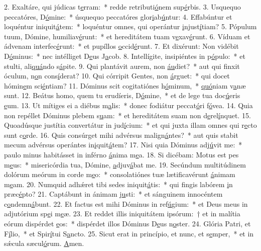 2. Exaltáre, qui júdicas t\uline{e}rram:~* redde retributi\uline{ó}nem sup\uline{é}rbis.
3. Usquequo peccatóres, D\uline{ó}mine:~* úsquequo peccatóres glor\uline{i}ab\uline{ú}ntur:
4. Effabúntur et loquéntur iniquit\uline{á}tem:~* loquéntur omnes, qui operántur \uline{i}njust\uline{í}tiam?
5. Pópulum tuum, Dómine, humiliav\uline{é}runt:~* et hereditátem tuam v\uline{e}xav\uline{é}runt.
6. Víduam et ádvenam interfec\uline{é}runt:~* et pupíllos \uline{o}ccid\uline{é}runt.
7. Et dixérunt: Non vidébit D\uline{ó}minus:~* nec intélliget D\uline{e}us J\uline{a}cob.
8. Intellígite, insipiéntes in p\uline{ó}pulo:~* et stulti, ali\uline{quá}ndo s\uline{á}pite.
9. Qui plantávit aurem, non \uline{áu}diet?~* aut qui finxit óculum, n\uline{o}n cons\uline{í}derat?
10. Qui córripit Gentes, non \uline{á}rguet:~* qui docet hómin\uline{e}m sci\uline{é}ntiam?
11. Dóminus scit cogitatiónes h\uline{ó}minum,~* \uline{quó}niam v\uline{a}næ sunt.
12. Beátus homo, quem tu erudíeris, D\uline{ó}mine,~* et de lege tua doc\uline{ú}eris \uline{e}um.
13. Ut mítiges ei a diébus m\uline{a}lis:~* donec fodiátur peccat\uline{ó}ri f\uline{ó}vea.
14. Quia non repéllet Dóminus plebem s\uline{u}am:~* et hereditátem suam non d\uline{e}rel\uline{í}nquet.
15. Quoadúsque justítia convertátur in jud\uline{í}cium:~* et qui juxta illam omnes qui r\uline{e}cto sunt c\uline{o}rde.
16. Quis consúrget mihi advérsus malign\uline{á}ntes?~* aut quis stabit mecum advérsus operántes in\uline{i}quit\uline{á}tem?
17. Nisi quia Dóminus adj\uline{ú}vit me:~* paulo minus habitásset in inférno \uline{á}nima m\uline{e}a.
18. Si dicébam: Motus est pes m\uline{e}us:~* misericórdia tua, Dómine, \uline{a}djuv\uline{á}bat me.
19. Secúndum multitúdinem dolórum meórum in corde m\uline{e}o:~* consolatiónes tuæ lætificavérunt \uline{á}nimam m\uline{e}am.
20. Numquid adhǽret tibi sedes iniquit\uline{á}tis:~* qui fingis labórem \uline{i}n præc\uline{é}pto?
21. Captábunt in ánimam j\uline{u}sti:~* et sánguinem innocéntem c\uline{o}ndemn\uline{á}bunt.
22. Et factus est mihi Dóminus in ref\uline{ú}gium:~* et Deus meus in adjutórium sp\uline{e}i m\uline{e}æ.
23. Et reddet illis iniquitátem ipsórum:~† et in malítia eórum dispérdet \uline{e}os:~* dispérdet illos Dóminus D\uline{e}us n\uline{o}ster.
24. Glória Patri, et F\uline{í}lio,~* et Spir\uline{í}tui S\uline{a}ncto.
25. Sicut erat in princípio, et nunc, et s\uline{e}mper,~* et in sǽcula sæcul\uline{ó}rum. \uline{A}men.
